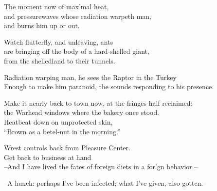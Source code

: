 The moment now of max'mal heat, \\
and pressurewaves whose radiation warpeth man, \\
and burns him up or out. 

Watch flutterfly, and unleaving, ants \\
are bringing off the body of a hard-shelled giant, \\
from the shelledland to their tunnels. 

Radiation warping man, he sees the Raptor in the Turkey \\
Enough to make him paranoid, the sounds responding to his presence. 

Make it nearly back to town now, at the fringes half-reclaimed: \\
the Warhead windows where the bakery once stood. \\
Heatbeat down on unprotected skin, \\
``Brown as a betel-nut in the morning.''

Wrest controls back from Pleasure Center. \\
Get back to business at hand \\

--And I have lived the fates of foreign diets in a for'gn behavior.--

--A hunch: perhaps I've been infected; what I've given, also gotten.--